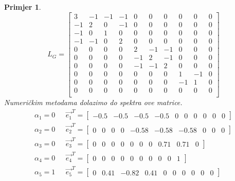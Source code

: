 \documentclass[11pt]{article}
\newtheorem{example}{Primjer}
\begin{document}
\begin{example}
			\[
				L_G =
				\begin{bmatrix}
					3   &  -1  &  -1  &  -1  &  0  &  0   &  0   &  0   &  0   &  0\\
					-1  &  2   &  0   &  -1  &  0  &  0   &  0   &  0   &  0   &  0\\
		-1  &  0   &  1   &  0   &  0  &  0   &  0   &  0   &  0   &  0\\
		-1  &  -1  &  0   &  2   &  0  &  0   &  0   &  0   &  0   &  0\\
		0   &  0   &  0   &  0   &  2  &  -1  &  -1  &  0   &  0   &  0\\
		0   &  0   &  0   &  0   &  -1 &  2   &  -1  &  0   &  0   &  0\\
		0   &  0   &  0   &  0   &  -1 &  -1  &  2   &  0   &  0   &  0\\
		0   &  0   &  0   &  0   &  0  &  0   &  0   &  1   &  -1  &  0\\
		0   &  0   &  0   &  0   &  0  &  0   &  0   &  -1  &  1   &  0\\
		0   &  0   &  0   &  0   &  0  &  0   &  0   &  0   &  0   &  0\\
	\end{bmatrix}
	\]
	Numeričkim metodama dolazimo do spektra ove matrice.
	\[
		\begin{split}
			\alpha_1=0 \text{  } & \vec{e_1}^T = \begin{bmatrix} -0.5  &   -0.5  &  -0.5  &  -0.5  &  0  &  0  &  0  &  0  &  0  & 0      \end{bmatrix} \\ 
			\alpha_2=0 \text{  } & \vec{e_2}^T = \begin{bmatrix} 0  &   0  &  0  &  0  &  -0.58  &  -0.58  &  -0.58  &  0  &  0  & 0      \end{bmatrix} \\ 
			\alpha_3=0 \text{  } & \vec{e_3}^T = \begin{bmatrix} 0  &  0  &  0  &  0  &  0  &  0  &  0  &  0.71  &  0.71  &  0            \end{bmatrix} \\
			\alpha_4=0 \text{  } & \vec{e_4}^T = \begin{bmatrix} 0  &  0  &  0  &  0  &  0  &  0  &  0  &  0  &  0  &  1                  \end{bmatrix} \\
			\alpha_5=1 \text{  } & \vec{e_5}^T = \begin{bmatrix} 0  &  0.41  &  -0.82  &  0.41  &  0  &  0  &  0  &  0  &  0  &  0        \end{bmatrix} \\

\end{split}\]
\end{example}
\end{document}
